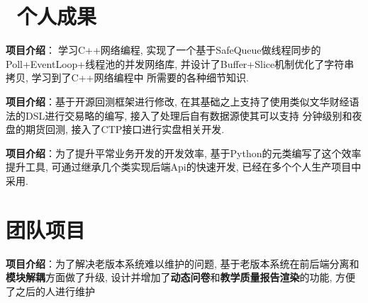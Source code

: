 \documentclass{resume}
\begin{document}
\section{\faBook\ 个人成果}

\begin{onehalfspacing}
\textbf{项目介绍}：\c 为学习C++网络编程, 实现了一个基于SafeQueue做线程同步的Poll+EventLoop+线程池的并发网络库, 并设计了Buffer+Slice机制优化了字符串拷贝, 学习到了C++网络编程中
所需要的各种细节知识.
\end{onehalfspacing}

\begin{onehalfspacing}
\textbf{项目介绍}：\quad 基于开源回测框架进行修改, 在其基础之上支持了使用类似文华财经语法的DSL进行交易略的编写, 接入了处理后自有数据源使其可以支持
分钟级别和夜盘的期货回测, 接入了CTP接口进行实盘相关开发.
\end{onehalfspacing}


\begin{onehalfspacing}
\textbf{项目介绍}：\quad 为了提升平常业务开发的开发效率, 基于Python的元类编写了这个效率提升工具, 可通过继承几个类实现后端Api的快速开发, 已经在多个个人生产项目中采用.
\end{onehalfspacing}


\section{\faObjectGroup 团队项目}
\begin{onehalfspacing}
  \textbf{项目介绍}：\quad 为了解决老版本系统难以维护的问题, 基于老版本系统在前后端分离和\textbf{模块解耦}方面做了升级, 设计并增加了\textbf{动态问卷}和\textbf{教学质量报告渲染}的功能, 方便了之后的人进行维护
\end{onehalfspacing}

\end{document}
